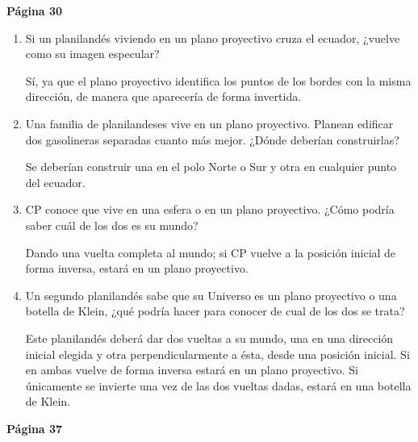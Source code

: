 \textbf{Página 30}
\begin{enumerate}
\item Si un planilandés viviendo en un plano proyectivo cruza el ecuador, ¿vuelve como su imagen especular?

Sí, ya que el plano proyectivo identifica los puntos de los bordes con la misma dirección, de manera que aparecería de forma invertida.

\item Una familia de planilandeses vive en un plano proyectivo. Planean edificar dos gasolineras separadas cuanto más mejor. ¿Dónde deberían construirlas?

Se deberían construir una en el polo Norte o Sur y otra en cualquier punto del ecuador.

\item CP conoce que vive en una esfera o en un plano proyectivo. ¿Cómo podría saber cuál de los dos es su mundo?

Dando una vuelta completa al mundo; si CP vuelve a la posición inicial de forma inversa, estará en un plano proyectivo.

\item Un segundo planilandés sabe que su Universo es un plano proyectivo o una botella de Klein, ¿qué podría hacer para conocer de cual de los dos se trata?

Este planilandés deberá dar dos vueltas a su mundo, una en una dirección inicial elegida y otra perpendicularmente a ésta, desde una posición inicial. Si en ambas vuelve de forma inversa estará en un plano proyectivo. Si únicamente se invierte una vez de las dos vueltas dadas, estará en una botella de Klein.

\end{enumerate}

\textbf{Página 37}

